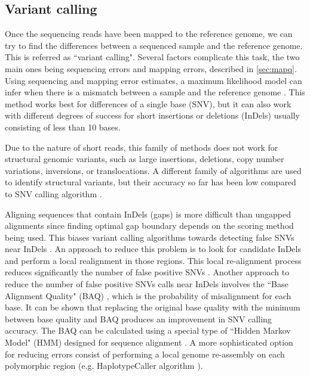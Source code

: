 \subsection{Variant calling}

Once the sequencing reads have been mapped to the reference genome, we can try to find the differences between a sequenced sample and the reference genome.  This is referred as  ``variant calling".  Several factors complicate this task, the two main ones being sequencing errors and mapping errors, described in \ref{sec:mapq}.  Using sequencing and mapping error estimates, a maximum likelihood model can infer when there is a mismatch between a sample and the reference genome \cite{li2008mapping}.  This method works best for differences of a single base (SNV), but it can also work with different degrees of success for short insertions or deletions (InDels) usually consisting of less than 10 bases.

Due to the nature of short reads, this family of methods does not work for structural genomic variants, such as large insertions, deletions, copy number variations, inversions, or translocations.  A different family of algorithms are used to identify structural variants, but their accuracy so far has been low compared to SNV calling algorithm \cite{o2013low}.

Aligning sequences that contain InDels (gaps) is more difficult than ungapped alignments since finding optimal gap boundary depends on the scoring method being used. This biases variant calling algorithms towards detecting false SNVs near InDels \cite{depristo2011framework}.  An approach to reduce this problem is to look for candidate InDels and perform a local realignment in those regions.  This local re-alignment process reduces significantly the number of false positive SNVs \cite{depristo2011framework}. Another approach to reduce the number of false positive SNVs calls near InDels involves the ``Base Alignment Quality" (BAQ) \cite{li2011improving}, which is the probability of misalignment for each base.  It can be shown that replacing the original base quality with the minimum between base quality and BAQ produces an improvement in SNV calling accuracy.  The BAQ can be calculated using a special type of ``Hidden Markov Model" (HMM) designed for sequence alignment \cite{li2011improving, durbin1998biological}. A more sophisticated option for reducing errors consist of performing a local genome re-assembly on each polymorphic region (e.g. HaplotypeCaller algorithm \cite{GATK}).

